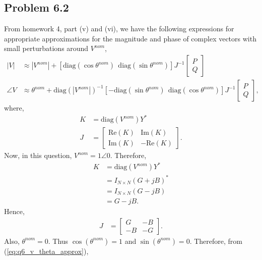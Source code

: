 \subsection*{Problem 6.2}
From homework 4, part (v) and (vi), we have the following expressions for appropriate approximations for the magnitude and phase of complex vectors with small perturbations around $V^{nom}$,
\begin{align}\label{eq:q6_v_theta_approx}
	|V| &\approx |V^{nom}| + [\text{diag}(\cos\theta^{nom})\ \ \text{diag}(\sin\theta^{nom})]J^{-1}\begin{bmatrix}
	P\\Q
	\end{bmatrix}\\
	\angle V &\approx \theta^{nom} + \text{diag}(|V^{nom}|)^{-1}[-\text{diag}(\sin\theta^{nom})\ \ \text{diag}(\cos\theta^{nom})]J^{-1}\begin{bmatrix}
	P\\Q
	\end{bmatrix},
\end{align}
where,
\begin{align*}
	K &= \text{diag}(V^{nom})Y^*\\
	J &= \begin{bmatrix}
	\text{Re}(K) & \text{Im}(K)\\\text{Im}(K) & -\text{Re}(K)
	\end{bmatrix}.
\end{align*}
Now, in this question, $V^{nom} = 1\angle 0$. Therefore,
\begin{align*}
	K &= \text{diag}(V^{nom})Y^*\\
	&= I_{N\times N} (G+jB)^*\\
	&= I_{N \times N}(G-jB)\\
	&= G-jB.
\end{align*}
Hence,
\begin{align*}
	J &= \begin{bmatrix}
		G & -B\\
		-B & -G
	\end{bmatrix}.
\end{align*}
Also, $\theta^{nom} = 0$. Thus $\cos(\theta^{nom}) = 1$ and $\sin(\theta^{nom}) = 0$. Therefore, from (\ref{eq:q6_v_theta_approx}),
